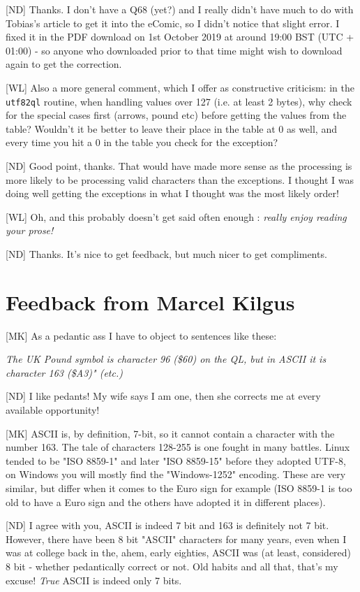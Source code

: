 [ND] Thanks. I don't have a Q68 (yet?) and I really didn't have much to do with Tobias's article to get it into the eComic, so I didn't notice that slight error. I fixed it in the PDF download on 1st October 2019 at around 19:00 BST (UTC + 01:00) - so anyone who downloaded prior to that time might wish to download again to get the correction.


[WL] Also a more general comment, which I offer as constructive criticism: in the  \texttt{utf82ql} routine, when handling values over 127 (i.e. at least 2 bytes), why check for the special cases first (arrows, pound etc) before getting the values from the table? Wouldn't it be better to leave their place in the table at 0 as well, and every time you hit a 0 in the table you check for the exception?

[ND] Good point, thanks. That would have made more sense as the processing is more likely to be processing valid characters than the exceptions. I thought I was doing well getting the exceptions in what I thought was the most likely order!


[WL] Oh, and this probably doesn't get said often enough : \emph{ really enjoy reading your prose!}

[ND] Thanks. It's nice to get feedback, but much nicer to get compliments. 



\section{Feedback from Marcel Kilgus}

[MK] As a pedantic ass I have to object to sentences like these:

\emph{The UK Pound symbol is character 96 (\$60) on the QL, but in ASCII
it is character 163 (\$A3)" (etc.)}

[ND] I like pedants! My wife says I am one, then she corrects me at every available opportunity!


[MK] ASCII is, by definition, 7-bit, so it cannot contain a character with
the number 163. The tale of characters 128-255 is one fought in many
battles. Linux tended to be "ISO 8859-1" and later "ISO 8859-15"
before they adopted UTF-8, on Windows you will mostly find the
"Windows-1252" encoding. These are very similar, but differ when it
comes to the Euro sign for example (ISO 8859-1 is too old to have a
Euro sign and the others have adopted it in different places).

[ND] I agree with you, ASCII is indeed 7 bit and 163 is definitely not 7 bit. However, there have been 8 bit "ASCII" characters for many years, even when I was at college back in the, ahem, early eighties, ASCII was (at least, considered) 8 bit - whether pedantically correct or not. Old habits and all that, that's my excuse! \emph{True} ASCII is indeed only 7 bits.

